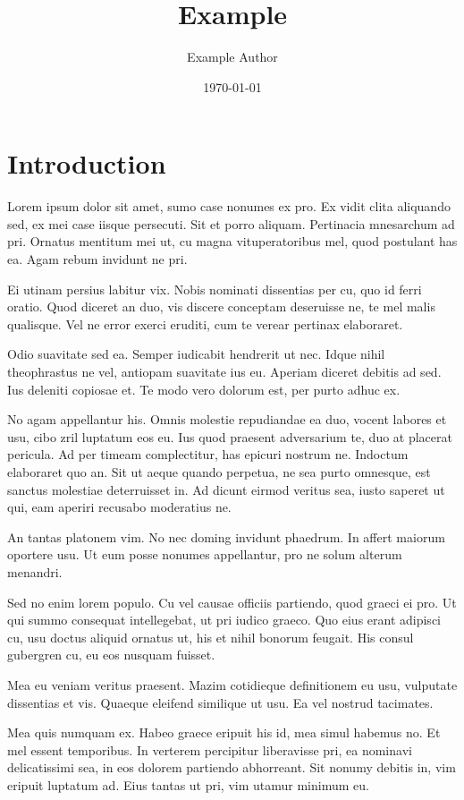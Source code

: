 \documentclass{article}
\title{Example}
\author {Example Author}
\date {\today}
\begin{document}
\maketitle
\listoffigures

\section{Introduction}
Lorem ipsum dolor sit amet, sumo case nonumes ex pro. Ex vidit clita aliquando sed, ex mei case iisque persecuti. Sit et porro aliquam. Pertinacia mnesarchum ad pri. Ornatus mentitum mei ut, cu magna vituperatoribus mel, quod postulant has ea. Agam rebum invidunt ne pri.

Ei utinam persius labitur vix. Nobis nominati dissentias per cu, quo id ferri oratio. Quod diceret an duo, vis discere conceptam deseruisse ne, te mel malis qualisque. Vel ne error exerci eruditi, cum te verear pertinax elaboraret.

Odio suavitate sed ea. Semper iudicabit hendrerit ut nec. Idque nihil theophrastus ne vel, antiopam suavitate ius eu. Aperiam diceret debitis ad sed. Ius deleniti copiosae et. Te modo vero dolorum est, per purto adhuc ex.

No agam appellantur his. Omnis molestie repudiandae ea duo, vocent labores et usu, cibo zril luptatum eos eu. Ius quod praesent adversarium te, duo at placerat pericula. Ad per timeam complectitur, has epicuri nostrum ne. Indoctum elaboraret quo an. Sit ut aeque quando perpetua, ne sea purto omnesque, est sanctus molestiae deterruisset in. Ad dicunt eirmod veritus sea, iusto saperet ut qui, eam aperiri recusabo moderatius ne.

An tantas platonem vim. No nec doming invidunt phaedrum. In affert maiorum oportere usu. Ut eum posse nonumes appellantur, pro ne solum alterum menandri.

Sed no enim lorem populo. Cu vel causae officiis partiendo, quod graeci ei pro. Ut qui summo consequat intellegebat, ut pri iudico graeco. Quo eius erant adipisci cu, usu doctus aliquid ornatus ut, his et nihil bonorum feugait. His consul gubergren cu, eu eos nusquam fuisset.

Mea eu veniam veritus praesent. Mazim cotidieque definitionem eu usu, vulputate dissentias et vis. Quaeque eleifend similique ut usu. Ea vel nostrud tacimates.

Mea quis numquam ex. Habeo graece eripuit his id, mea simul habemus no. Et mel essent temporibus. In verterem percipitur liberavisse pri, ea nominavi delicatissimi sea, in eos dolorem partiendo abhorreant. Sit nonumy debitis in, vim eripuit luptatum ad. Eius tantas ut pri, vim utamur minimum eu.
\end{document}
